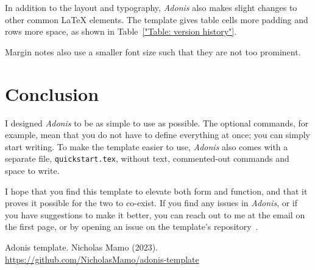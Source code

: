 \documentclass{adonis}
\begin{document}
		In addition to the layout and typography, \textit{Adonis} also makes slight changes to other common \LaTeX{} elements.
		The template gives table cells more padding and rows more space, as shown in Table~\ref{"Table: version history"}.

		Margin notes also use a smaller font size such that they are not too prominent.
	
	\section{Conclusion}
	
		I designed \textit{Adonis} to be as simple to use as possible.
		The optional commands, for example, mean that you do not have to define everything at once; you can simply start writing.
		To make the template easier to use, \textit{Adonis} also comes with a separate file, \texttt{quickstart.tex}, without text, commented-out commands and space to write.
		
		I hope that you find this template to elevate both form and function, and that it proves it possible for the two to co-exist.
		If you find any issues in \textit{Adonis}, or if you have suggestions to make it better, you can reach out to me at the email on the first page, or by opening an issue on the template's repository~\cite{repository}.
		
	\begin{thebibliography}{9}
		Adonis template. Nicholas Mamo (2023). \url{https://github.com/NicholasMamo/adonis-template}
	\end{thebibliography}
	
\end{document}
